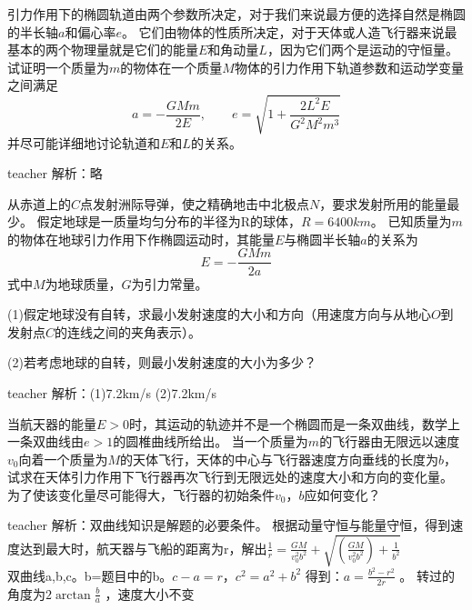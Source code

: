 \begin{example}
引力作用下的椭圆轨道由两个参数所决定，对于我们来说最方便的选择自然是椭圆的半长轴$a$和偏心率$e$。
它们由物体的性质所决定，对于天体或人造飞行器来说最基本的两个物理量就是它们的能量$E$和角动量$L$，因为它们两个是运动的守恒量。
试证明一个质量为$m$的物体在一个质量$M$物体的引力作用下轨道参数和运动学变量之间满足
\begin{equation}\nonumber
a=-\frac{GMm}{2E},\qquad e=\sqrt{1+\frac{2L^2E}{G^2M^2m^3}}
\end{equation}
并尽可能详细地讨论轨道和$E$和$L$的关系。
\begin{taggedblock}{teacher}
\newline
解析：略
\end{taggedblock}
\end{example}



\begin{example}

从赤道上的$C$点发射洲际导弹，使之精确地击中北极点$N$，要求发射所用的能量最少。
假定地球是一质量均匀分布的半径为R的球体，$R=6400\unit{km}$。
已知质量为$m$的物体在地球引力作用下作椭圆运动时，其能量$E$与椭圆半长轴$a$的关系为
\[
E = -\frac{GMm}{2a}
\]
式中$M$为地球质量，$G$为引力常量。

(1)假定地球没有自转，求最小发射速度的大小和方向（用速度方向与从地心$O$到发射点$C$的连线之间的夹角表示）。

(2)若考虑地球的自转，则最小发射速度的大小为多少？


\begin{taggedblock}{teacher}
\noindent
解析：(1)7.2km/s    (2)7.2km/s
\end{taggedblock}
\end{example}


\begin{example}
当航天器的能量$E>0$时，其运动的轨迹并不是一个椭圆而是一条双曲线，数学上一条双曲线由$e>1$的圆椎曲线所给出。
当一个质量为$m$的飞行器由无限远以速度$v_0$向着一个质量为$M$的天体飞行，天体的中心与飞行器速度方向垂线的长度为$b$，试求在天体引力作用下飞行器再次飞行到无限远处的速度大小和方向的变化量。
为了使该变化量尽可能得大，飞行器的初始条件$v_0$，$b$应如何变化？
\begin{taggedblock}{teacher}
\newline
解析：双曲线知识是解题的必要条件。
根据动量守恒与能量守恒，得到速度达到最大时，航天器与飞船的距离为r，解出$\frac{1}{r}=\frac{GM}{v_0^2b^2}+\sqrt{(\frac{GM}{v_0^2b^2})+\frac{1}{b^2}}$
\\双曲线a,b,c。b=题目中的b。$c-a=r，c^2=a^2+b^2$  得到：$a=\frac{b^2-r^2}{2r}$ 。
转过的角度为$2\arctan\frac{b}{a}$ ，速度大小不变
\end{taggedblock}
\end{example}




